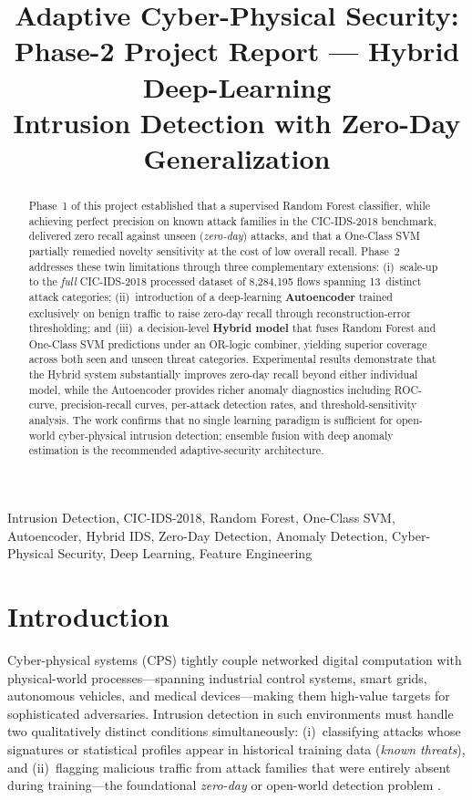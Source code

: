 \documentclass[10pt,conference]{IEEEtran}
\title{Adaptive Cyber-Physical Security:\\Phase-2 Project Report — Hybrid Deep-Learning\\Intrusion Detection with Zero-Day Generalization}
\author{
  \IEEEauthorblockN{Pugazhendhi J}
  \IEEEauthorblockA{
    \textit{Department of CS and AI}\\
    Rishihood University\\
    Sonipat, India\\
    \href{mailto:pugazhendhi.j23csai@nst.rishihood.edu.in}
         {pugazhendhi.j23csai@nst.rishihood.edu.in}}
  \and
  \IEEEauthorblockN{Dally R}
  \IEEEauthorblockA{
    \textit{Department of CS and AI}\\
    Rishihood University\\
    Sonipat, India\\
    \href{mailto:dally.r23csai@nst.rishihood.edu.in}
         {dally.r23csai@nst.rishihood.edu.in}}
}
\begin{document}
\maketitle

\begin{abstract}
Phase~1 of this project established that a supervised Random Forest
classifier, while achieving perfect precision on known attack families
in the CIC-IDS-2018 benchmark, delivered zero recall against unseen
(\emph{zero-day}) attacks, and that a One-Class SVM partially remedied
novelty sensitivity at the cost of low overall recall. Phase~2 addresses
these twin limitations through three complementary extensions: (i)~scale-up
to the \emph{full} CIC-IDS-2018 processed dataset of
8{,}284{,}195 flows spanning 13~distinct attack categories; (ii)~introduction
of a deep-learning \textbf{Autoencoder} trained exclusively on benign traffic
to raise zero-day recall through reconstruction-error thresholding; and
(iii)~a decision-level \textbf{Hybrid model} that fuses Random Forest and
One-Class SVM predictions under an OR-logic combiner, yielding superior
coverage across both seen and unseen threat categories. Experimental results
demonstrate that the Hybrid system substantially improves zero-day recall
beyond either individual model, while the Autoencoder provides richer
anomaly diagnostics including ROC-curve, precision-recall curves,
per-attack detection rates, and threshold-sensitivity analysis. The work
confirms that no single learning paradigm is sufficient for open-world
cyber-physical intrusion detection; ensemble fusion with deep anomaly
estimation is the recommended adaptive-security architecture.
\end{abstract}

\begin{IEEEkeywords}
Intrusion Detection, CIC-IDS-2018, Random Forest, One-Class SVM,
Autoencoder, Hybrid IDS, Zero-Day Detection, Anomaly Detection,
Cyber-Physical Security, Deep Learning, Feature Engineering
\end{IEEEkeywords}

\section{Introduction}
\label{sec:intro}

Cyber-physical systems (CPS) tightly couple networked digital computation
with physical-world processes—spanning industrial control systems, smart
grids, autonomous vehicles, and medical devices—making them high-value
targets for sophisticated adversaries. Intrusion detection in such
environments must handle two qualitatively distinct conditions
simultaneously: (i)~classifying attacks whose signatures or statistical
profiles appear in historical training data (\emph{known threats}), and
(ii)~flagging malicious traffic from attack families that were entirely
absent during training—the foundational \emph{zero-day} or open-world
detection problem \cite{buczak2016}.
\end{document}
